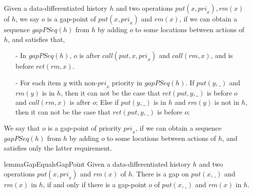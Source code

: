 \begin{definition}\label{def:gap-point for matched put and rm operations}

Given a data-differentiated history $h$ and two operations $\textit{put}(x,\textit{pri}_x),\textit{rm}(x)$ of $h$, we say $o$ is a gap-point of $\textit{put}(x,\textit{pri}_x)$ and $\textit{rm}(x)$, if we can obtain a sequence $\textit{gapPSeq}(h)$ from $h$ by adding $o$ to some locations between actions of $h$, and satisfies that,

\begin{itemize}
\setlength{\itemsep}{0.5pt}
\item[-] In $\textit{gapPSeq}(h)$, $o$ is after $\textit{call}(\textit{put},x,\textit{pri}_x)$ and $\textit{call}(\textit{rm},x)$, and is before $\textit{ret}(\textit{rm},x)$.
\item[-] For each item $y$ with non-$\textit{pri}_x$ priority in $\textit{gapPSeq}(h)$. If $\textit{put}(y,\_)$ and $\textit{rm}(y)$ is in $h$, then it can not be the case that $\textit{ret}(\textit{put},y,\_)$ is before $o$ and $\textit{call}(\textit{rm},x)$ is after $o$; Else if $\textit{put}(y,\_)$ is in $h$ and $\textit{rm}(y)$ is not in $h$, then it can not be the case that $\textit{ret}(\textit{put},y,\_)$ is before $o$;
\end{itemize}

We say that $o$ is a gap-point of priority $\textit{pri}_x$, if we can obtain a sequence $\textit{gapPSeq}(h)$ from $h$ by adding $o$ to some locations between actions of $h$, and satisfies only the latter requirement.
\end{definition}




\begin{restatable}{lemma}{GapEqualsGapPoint}
\label{lemma:gap eqals the existence of gap point}
Given a data-differentiated history $h$ and two operations $\textit{put}(x,\textit{pri}_x)$ and $\textit{rm}(x)$ of $h$. There is a gap on $\textit{put}(x,\_)$ and $\textit{rm}(x)$ in $h$, if and only if there is a gap-point $o$ of $\textit{put}(x,\_)$ and $\textit{rm}(x)$ in $h$.
\end{restatable}


